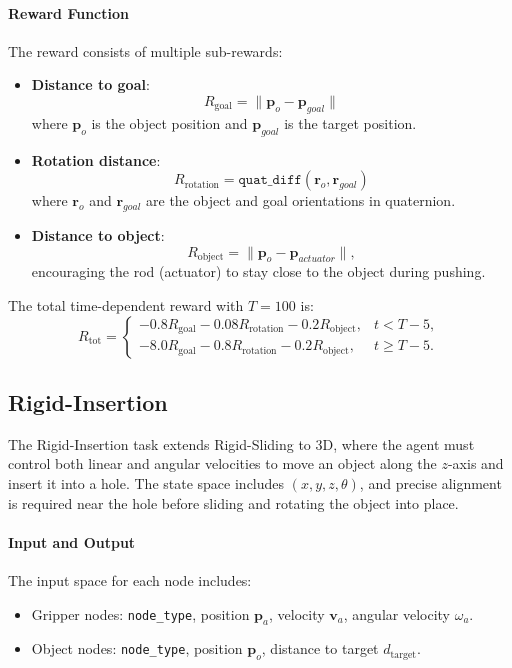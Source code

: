 \paragraph{Reward Function}
The reward consists of multiple sub-rewards:

\begin{itemize}
    \item \textbf{Distance to goal}: \[
        R_\text{goal} = \lVert \mathbf{p}_o - \mathbf{p}_{goal} \rVert
    \]
    where $\mathbf{p}_o$ is the object position and $\mathbf{p}_{goal}$ is the target position.
    \item \textbf{Rotation distance}: \[
        R_\text{rotation} = \texttt{quat\_diff}(\mathbf{r}_o, \mathbf{r}_{goal})
    \]
    where $\mathbf{r}_o$ and $\mathbf{r}_{goal}$ are the object and goal orientations in quaternion.
    \item \textbf{Distance to object}: \[
        R_\text{object} = \lVert \mathbf{p}_o - \mathbf{p}_{actuator} \rVert,
    \]
    encouraging the rod (actuator) to stay close to the object during pushing.

\end{itemize}

The total time-dependent reward with $T=100$ is:
\begin{equation*}
    R_\text{tot} = \begin{cases}
        -0.8 R_\text{goal} - 0.08 R_\text{rotation} - 0.2 R_\text{object}, & t < T-5, \\
        -8.0 R_\text{goal} - 0.8 R_\text{rotation} - 0.2 R_\text{object}, & t \geq T-5.
    \end{cases}
\end{equation*}

\subsection{Rigid-Insertion}

The Rigid-Insertion task extends Rigid-Sliding to 3D, where the agent must control both linear and angular velocities to move an object along the $z$-axis and insert it into a hole. The state space includes $(x, y, z, \theta)$, and precise alignment is required near the hole before sliding and rotating the object into place.



\paragraph{Input and Output}
The input space for each node includes:
\begin{itemize}
    \item Gripper nodes: \texttt{node\_type}, position $\mathbf{p}_a$, velocity $\mathbf{v}_a$, angular velocity $\omega_a$.
    \item Object nodes: \texttt{node\_type}, position $\mathbf{p}_o$, distance to target $d_{\text{target}}$.
\end{itemize}

